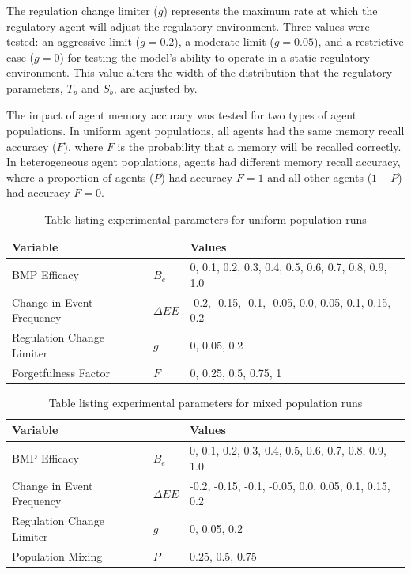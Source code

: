 The regulation change limiter ($g$) represents the maximum rate at which
the regulatory agent will adjust the regulatory environment.
Three values were tested: an aggressive limit ($g=0.2$),
a moderate limit ($g=0.05$), and
a restrictive case ($g=0$) for testing the model's ability to
operate in a static regulatory environment.
This value alters the width of the distribution that the regulatory
parameters, $T_p$ and $S_b$, are adjusted by.

The impact of agent memory accuracy was tested for two types of agent
populations.
In uniform agent populations, all agents had the same memory recall
accuracy ($F$), where $F$ is the probability that a memory will be
recalled correctly.
In heterogeneous agent populations, agents had different memory recall
accuracy, 
where a proportion of agents ($P$) had accuracy $F=1$
and all other agents ($1-P$) had accuracy $F=0$.

\begin{table}
\centering
\caption{Table listing experimental parameters for uniform population runs}
\label{tab:farm_ex_ar}
\begin{tabular}{lll}
\hline
Variable & & Values \\
\hline
BMP Efficacy & $B_e$ & 0, 0.1, 0.2, 0.3, 0.4, 0.5, 0.6, 0.7, 0.8, 0.9, 1.0 \\
Change in Event Frequency & $\Delta EE$
    & -0.2, -0.15, -0.1, -0.05, 0.0, 0.05, 0.1, 0.15, 0.2 \\
Regulation Change Limiter & $g$
    & 0, 0.05, 0.2 \\
Forgetfulness Factor & $F$ & 0, 0.25, 0.5, 0.75, 1 \\
\hline
\end{tabular}
\end{table}

\begin{table}
\centering
\caption{Table listing experimental parameters for mixed population runs}
\label{tab:farm_ex_mix}
\begin{tabular}{lll}
\hline
Variable & & Values \\
\hline
BMP Efficacy & $B_e$ & 0, 0.1, 0.2, 0.3, 0.4, 0.5, 0.6, 0.7, 0.8, 0.9, 1.0 \\
Change in Event Frequency & $\Delta EE$
    & -0.2, -0.15, -0.1, -0.05, 0.0, 0.05, 0.1, 0.15, 0.2 \\
Regulation Change Limiter & $g$
    & 0, 0.05, 0.2 \\
Population Mixing & $P$ & 0.25, 0.5, 0.75 \\
\hline
\end{tabular}
\end{table}

